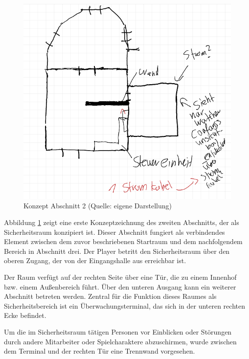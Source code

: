 \begin{figure}[ht]
\centering
\includegraphics[width=1\linewidth]{content/pictures/Abschnitt_Concept_01.PNG}
\caption{Konzept Abschnitt 2 (Quelle: eigene Darstellung)}
\label{fig:section_01_concept}
\end{figure}

Abbildung \ref{fig:section_01_concept} zeigt eine erste Konzeptzeichnung des zweiten Abschnitts, der als Sicherheitsraum konzipiert ist. Dieser Abschnitt fungiert als verbindendes Element zwischen dem zuvor beschriebenen Startraum und dem nachfolgendem Bereich in Abschnitt drei. Der Player betritt den Sicherheitsraum über den oberen Zugang, der von der Eingangshalle aus erreichbar ist.

Der Raum verfügt auf der rechten Seite über eine Tür, die zu einem Innenhof bzw. einem Außenbereich führt. Über den unteren Ausgang kann ein weiterer Abschnitt betreten werden. Zentral für die Funktion dieses Raumes als Sicherheitsbereich ist ein Überwachungsterminal, das sich in der unteren rechten Ecke befindet.

Um die im Sicherheitsraum tätigen Personen vor Einblicken oder Störungen durch andere Mitarbeiter oder Spielcharaktere abzuschirmen, wurde zwischen dem Terminal und der rechten Tür eine Trennwand vorgesehen.

